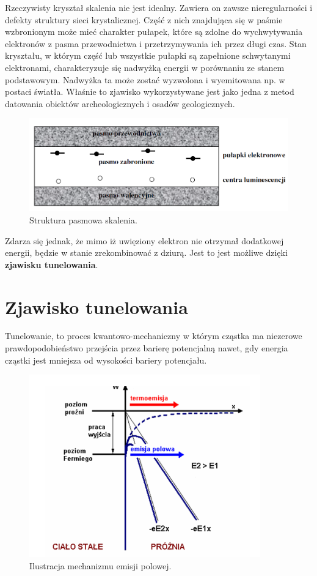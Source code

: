 Rzeczywisty kryształ skalenia nie jest idealny. Zawiera on zawsze nieregularności i defekty struktury sieci krystalicznej. Część z nich znajdująca się w paśmie wzbronionym może mieć charakter pułapek, które są zdolne do wychwytywania
elektronów z pasma przewodnictwa i przetrzymywania ich przez długi czas. Stan kryształu, w którym część lub wszystkie pułapki są zapełnione schwytanymi elektronami,
charakteryzuje się nadwyżką energii w porównaniu ze stanem podstawowym.  Nadwyżka ta może zostać wyzwolona i wyemitowana np. w postaci światła. Właśnie to zjawisko wykorzystywane jest jako jedna z metod datowania obiektów archeologicznych
i osadów geologicznych. 
\begin{figure}[h]
\centering
\includegraphics[width=15cm]{strukturapasmowa}
\caption{Struktura pasmowa skalenia. \cite{struktura_pasmowa}}
\label{fig:Struktura pasmowa}
\end{figure}

Zdarza się jednak, że mimo iż uwięziony elektron nie otrzymał dodatkowej energii, będzie w stanie zrekombinować z dziurą. Jest to jest możliwe dzięki  \textbf{zjawisku tunelowania}.

\section{Zjawisko tunelowania}
Tunelowanie, to  proces kwantowo-mechaniczny w którym cząstka ma niezerowe prawdopodobieństwo przejścia przez barierę potencjalną nawet, gdy energia cząstki jest mniejsza od wysokości bariery potencjału.


\begin{figure}[H]
\centering
\includegraphics[width=10cm]{tunelowanie}
\caption{Ilustracja mechanizmu emisji polowej. \cite{tunel_pic}}
\label{fig:Tunelowanie}
\end{figure}



